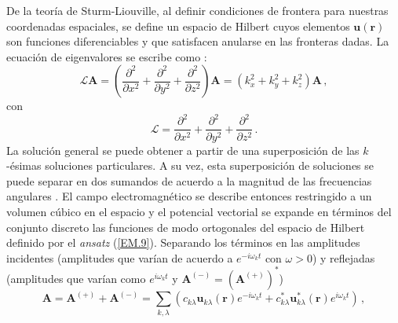 De la teoría de Sturm-Liouville, al definir condiciones de frontera para nuestras coordenadas espaciales, se define un espacio de Hilbert cuyos elementos $\mathbf{u}(\mathbf{r})$ son funciones diferenciables y que satisfacen anularse en las fronteras dadas. La ecuación de eigenvalores se escribe como \cite{Arfken}:
\begin{equation}
  \label{EM.10}
  \mathcal{L} \mathbf{A} = \left( \frac{\partial^2}{\partial x^2} + \frac{\partial^2}{\partial y^2} + \frac{\partial^2}{\partial z^2} \right) \mathbf{A} = (k_x^2 + k_y^2 + k_z^2) \mathbf{A} \,,
\end{equation}
con
\begin{equation}
  \label{EM.11}
  \mathcal{L} = \frac{\partial^2}{\partial x^2} + \frac{\partial^2}{\partial y^2} + \frac{\partial^2}{\partial z^2} \,.
\end{equation}
La solución general se puede obtener a partir de una superposición de las $k$-ésimas soluciones particulares. A su vez, esta superposición de soluciones se puede separar en dos sumandos de acuerdo a la magnitud de las frecuencias angulares \cite{Riley}. El campo electromagnético se describe entonces restringido a un volumen cúbico en el espacio y el potencial vectorial se expande en términos del conjunto discreto las funciones de modo ortogonales del espacio de Hilbert definido por el \textit{ansatz} (\ref{EM.9}). Separando los términos en las amplitudes incidentes (amplitudes que varían de acuerdo a $e^{-i\omega_k t}$ con $\omega>0$) y reflejadas (amplitudes que varían como $e^{i\omega_k t }$ y $\mathbf{A}^{(-)} = (\mathbf{A}^{(+)})^*$) %
\begin{equation}
  \label{EM.12}
  \mathbf{A} = \mathbf{A}^{(+)} + \mathbf{A}^{(-)} = \sum_{k,\lambda} \left( c_{k\lambda} \mathbf{u}_{k\lambda} (\mathbf{r})e^{-i\omega_k t} +  c_{k\lambda}^* \mathbf{u}_{k\lambda}^* (\mathbf{r})e^{i\omega_{k} t} \right) \,,
\end{equation}

